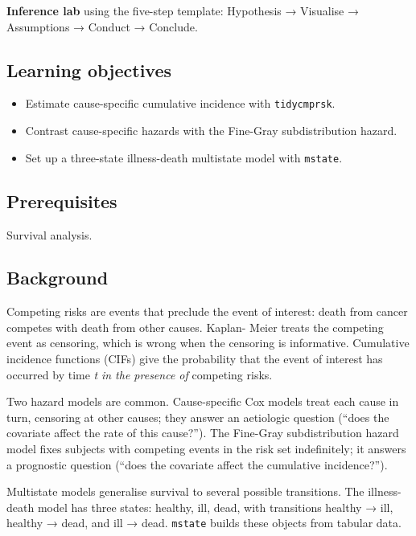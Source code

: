 \documentclass[
]{article}
\author{}
\date{\vspace{-2.5em}}
\providecommand{\tightlist}{%
  \setlength{\itemsep}{0pt}\setlength{\parskip}{0pt}}
\begin{document}
\textbf{Inference lab} using the five-step template: Hypothesis →
Visualise → Assumptions → Conduct → Conclude.

\subsection{Learning objectives}\label{learning-objectives}

\begin{itemize}
\tightlist
\item
  Estimate cause-specific cumulative incidence with \texttt{tidycmprsk}.
\item
  Contrast cause-specific hazards with the Fine-Gray subdistribution
  hazard.
\item
  Set up a three-state illness-death multistate model with
  \texttt{mstate}.
\end{itemize}

\subsection{Prerequisites}\label{prerequisites}

Survival analysis.

\subsection{Background}\label{background}

Competing risks are events that preclude the event of interest: death
from cancer competes with death from other causes. Kaplan- Meier treats
the competing event as censoring, which is wrong when the censoring is
informative. Cumulative incidence functions (CIFs) give the probability
that the event of interest has occurred by time \emph{t} \emph{in the
presence of} competing risks.

Two hazard models are common. Cause-specific Cox models treat each cause
in turn, censoring at other causes; they answer an aetiologic question
(``does the covariate affect the rate of this cause?''). The Fine-Gray
subdistribution hazard model fixes subjects with competing events in the
risk set indefinitely; it answers a prognostic question (``does the
covariate affect the cumulative incidence?'').

Multistate models generalise survival to several possible transitions.
The illness-death model has three states: healthy, ill, dead, with
transitions healthy → ill, healthy → dead, and ill → dead.
\texttt{mstate} builds these objects from tabular data.
\end{document}
